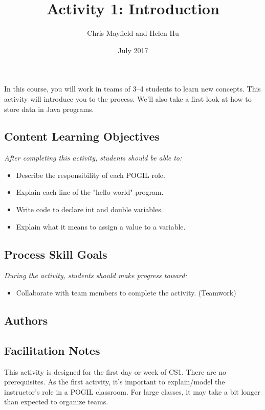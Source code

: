 \documentclass[12pt]{article}
\title{Activity 1: Introduction}
\author{Chris Mayfield and Helen Hu}
\date{July 2017}
\begin{document}
\maketitle

In this course, you will work in teams of 3--4 students to learn new concepts.
This activity will introduce you to the process.
We'll also take a first look at how to store data in Java programs.

\subsection*{Content Learning Objectives}
\textit{After completing this activity, students should be able to:}

\begin{itemize}[itemsep=0pt]
\item Describe the responsibility of each POGIL role.
\item Explain each line of the "hello world" program.
\item Write code to declare int and double variables.
\item Explain what it means to assign a value to a variable.
\end{itemize}
\vspace*{-3ex}

\subsection*{Process Skill Goals}
\textit{During the activity, students should make progress toward:}

\begin{itemize}[itemsep=0pt]
\item Collaborate with team members to complete the activity. (Teamwork)
\end{itemize}
\vspace*{-3ex}

\subsection*{Authors}
\makeatletter
\@author
\makeatother

\ifdefined\Teacher
\color{DarkGray}

\subsection*{Facilitation Notes}

This activity is designed for the first day or week of CS1. There are no prerequisites. As the first activity, it's important to explain/model the instructor's role in a POGIL classroom. For large classes, it may take a bit longer than expected to organize teams.
\end{document}

